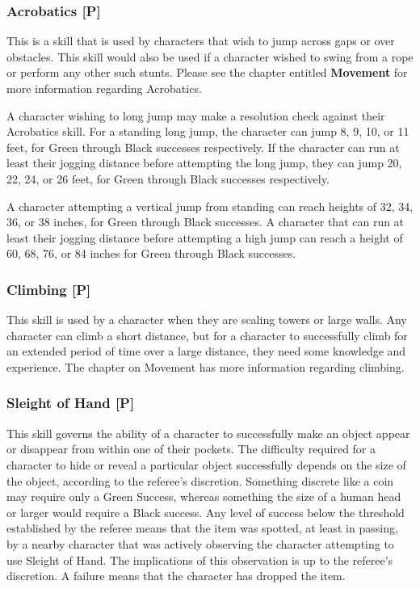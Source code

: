 \documentclass[oneside]{book}
\begin{document}
\begin{multicols}{2}
\subsubsection{Acrobatics [P]}
This is a skill that is used by characters that wish to jump across gaps or over obstacles. This skill would also be used if a character wished to swing from a rope or perform any other such stunts. Please see the chapter entitled \textbf{Movement} for more information regarding Acrobatics.

A character wishing to long jump may make a resolution check against their Acrobatics skill. For a standing long jump, the character can jump 8, 9, 10, or 11 feet, for Green through Black successes respectively.
If the character can run at least their jogging distance before attempting the long jump, they can jump 20, 22, 24, or 26 feet, for Green through Black successes respectively.

A character attempting a vertical jump from standing can reach heights of 32, 34, 36, or 38 inches, for Green through Black successes. A character that can run at least their jogging distance before attempting a high jump can reach a height of 60, 68, 76, or 84 inches for Green through Black successes.
\subsubsection{Climbing [P]}
This skill is used by a character when they are scaling towers or large walls. Any character can climb a short distance, but for a character to successfully climb for an extended period of time over a large distance, they need some knowledge and experience. The chapter on Movement has more information regarding climbing. 

\subsubsection{Sleight of Hand [P]}
This skill governs the ability of a character to successfully make an object appear or disappear from within one of their pockets. The difficulty required for a character to hide or reveal a particular object successfully depends on the size of the object, according to the referee's discretion. Something discrete like a coin may require only a Green Success, whereas something the size of a human head or larger would require a Black success. Any level of success below the threshold established by the referee means that the item was spotted, at least in passing, by a nearby character that was actively observing the character attempting to use Sleight of Hand. The implications of this observation is up to the referee's discretion. A failure means that the character has dropped the item. 


\end{multicols}
\end{document}
